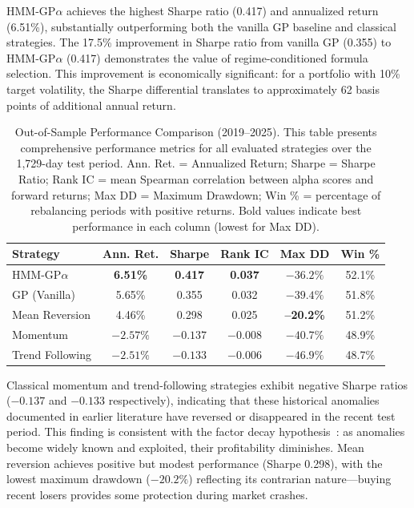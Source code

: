 \documentclass{ieeeaccess}
\begin{document}
HMM-GP$\alpha$ achieves the highest Sharpe ratio (0.417) and annualized return (6.51\%), substantially outperforming both the vanilla GP baseline and classical strategies. The 17.5\% improvement in Sharpe ratio from vanilla GP (0.355) to HMM-GP$\alpha$ (0.417) demonstrates the value of regime-conditioned formula selection. This improvement is economically significant: for a portfolio with 10\% target volatility, the Sharpe differential translates to approximately 62 basis points of additional annual return.

\begin{table}[!htbp]
\centering
\caption{Out-of-Sample Performance Comparison (2019--2025). This table presents comprehensive performance metrics for all evaluated strategies over the 1,729-day test period. Ann. Ret. = Annualized Return; Sharpe = Sharpe Ratio; Rank IC = mean Spearman correlation between alpha scores and forward returns; Max DD = Maximum Drawdown; Win \% = percentage of rebalancing periods with positive returns. Bold values indicate best performance in each column (lowest for Max DD).}
\label{tab:main_results}
\begin{tabular}{lccccc}
\toprule
\textbf{Strategy} & \textbf{Ann. Ret.} & \textbf{Sharpe} & \textbf{Rank IC} & \textbf{Max DD} & \textbf{Win \%} \\
\midrule
HMM-GP$\alpha$ & \textbf{6.51\%} & \textbf{0.417} & \textbf{0.037} & $-36.2\%$ & 52.1\% \\
GP (Vanilla) & 5.65\% & 0.355 & 0.032 & $-39.4\%$ & 51.8\% \\
Mean Reversion & 4.46\% & 0.298 & 0.025 & \textbf{--20.2\%} & 51.2\% \\
Momentum & $-2.57\%$ & $-0.137$ & $-0.008$ & $-40.7\%$ & 48.9\% \\
Trend Following & $-2.51\%$ & $-0.133$ & $-0.006$ & $-46.9\%$ & 48.7\% \\
\bottomrule
\end{tabular}
\end{table}

Classical momentum and trend-following strategies exhibit negative Sharpe ratios ($-0.137$ and $-0.133$ respectively), indicating that these historical anomalies documented in earlier literature have reversed or disappeared in the recent test period. This finding is consistent with the factor decay hypothesis~\cite{b3}: as anomalies become widely known and exploited, their profitability diminishes. Mean reversion achieves positive but modest performance (Sharpe 0.298), with the lowest maximum drawdown ($-20.2\%$) reflecting its contrarian nature---buying recent losers provides some protection during market crashes.
\end{document}
